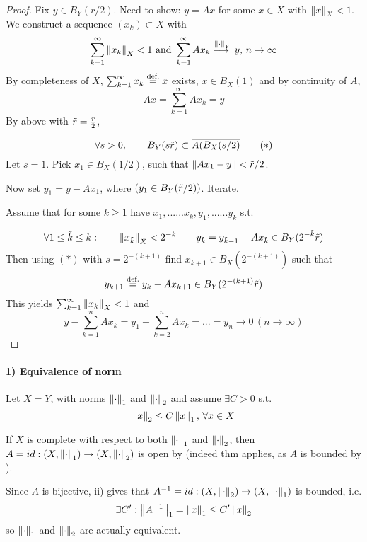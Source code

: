 \documentclass{article}
\begin{document}
\begin{proof}
Fix $y\in B_Y(r/2)$. Need to show: $y=Ax$ for some $x\in X$ with $\left\|{x}\right\|_X<1.$\\
We construct a sequence $(x_k)\subset X$ with 
$$
\sum_{k=1}^\infty \left\|{x_k}\right\|_X<1\,\,\text{and}\,\,\sum_{k=1}^\infty Ax_k\stackrel{\left\|{\cdot}\right\|_Y}{\longrightarrow{}}y,\,n\to\infty
$$
By completeness of $X$, $\sum_{k=1}^\infty x_k\stackrel{\text{def.}}{=} x$ exists, $x\in B_X(1)$ and by continuity of $A$,
$$Ax=\sum_{k=1}^\infty Ax_k=y$$
By  above with $\Tilde{r}=\frac{r}{2}$,  

\begin{equation*}
    \forall s>0, \qquad B_Y(s\Tilde{r})\subset \overline{A(B_X(s/2)}
    \tag{$*$}
\end{equation*}
Let $s=1$. Pick $x_1\in B_X(1/2)$, such that $\left\|{Ax_1-y}\right\|<\Tilde{r}/2$. 

Now set $y_1=y-Ax_1$, where $(y_1 \in B_Y(\Tilde{r}/2))$. Iterate.  

Assume that for some $k \geq 1$ have $x_1,......x_k,y_1,......y_k$ s.t.

$$
\forall 1\leq\tilde{k}\leq k:\qquad \left\|{x_{\Tilde{k}}}\right\|_X < 2^{-k}\qquad y_{\tilde{k}}=y_{\tilde{k}-1}-Ax_{\tilde{k}}\in B_Y(2^{-\Tilde{k}}\Tilde{r})
$$
Then using $(*)$ with $s=2^{-(k+1)}$ find $x_{k+1}\in B_X(2^{-(k+1)})$ such that
$$
y_{k+1}\stackrel{\text{def.}}{=} y_k-Ax_{k+1}\in B_Y(2^{-(k+1)}\Tilde{r})
$$
This yields $\sum_{k=1}^{\infty}\left\|{x_k}\right\|_X<1$ and 
$$
y-\sum_{k=1}^n Ax_k=y_1-\sum_{k=2}^n Ax_k=...=y_n\to0\,(n\to \infty)
$$
\end{proof}

\paragraph{\underline{\textbf{1) Equivalence of norm}}}

\begin{example}\nl
Let $X=Y$, with norms $\left\|{\cdot}\right\|_1$ and $\left\|{\cdot}\right\|_2$ and assume $\exists C>0$ s.t.
\begin{equation}
\label{equivalence of norm example}
    \left\|{x}\right\|_2\leq C\left\|{x}\right\|_1,\,\forall x\in X
\end{equation}

If $X$ is complete with respect to both $\left\|{\cdot}\right\|_1$ and $\left\|{\cdot}\right\|_2$, then $A=id:(X,\left\|{\cdot}\right\|_1)\to(X,\left\|{\cdot}\right\|_2)$ is open by  (indeed thm applies, as $A$ is bounded by ). 

Since $A$ is bijective, ii) gives that $A^{-1}=id:(X,\left\|{\cdot}\right\|_2)\to(X,\left\|{\cdot}\right\|_1)$ is bounded, i.e.
$$
\exists C': \left\|{A^{-1}}\right\|_1=\left\|{x}\right\|_1\leq C'\left\|{x}\right\|_2
$$
so $\left\|{\cdot}\right\|_1$ and $\left\|{\cdot}\right\|_2$ are actually equivalent.
\end{example}
\end{document}
